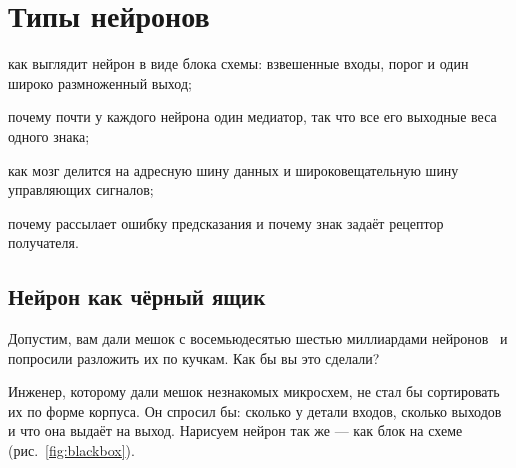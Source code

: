 \chapter{Типы нейронов}
\label{sec:neurontypes}
\begin{chaptergoals}
\item как выглядит нейрон в виде блока схемы: взвешенные входы, порог и один широко размноженный выход;
\item почему почти у каждого нейрона один медиатор, так что все его выходные веса одного знака;
\item как мозг делится на адресную шину данных и широковещательную шину управляющих сигналов;
\item почему  рассылает ошибку предсказания и почему знак задаёт рецептор получателя.
\end{chaptergoals}

\section{Нейрон как чёрный ящик}

Допустим, вам дали мешок с восемьюдесятью шестью миллиардами нейронов~\cite{Azevedo2009} и попросили разложить их по кучкам. Как бы вы это сделали?

Инженер, которому дали мешок незнакомых микросхем, не стал бы сортировать их по форме корпуса. Он спросил бы: сколько у детали входов, сколько выходов и что она выдаёт на выход. Нарисуем нейрон так же --- как блок на схеме (рис.~\ref{fig:blackbox}).

